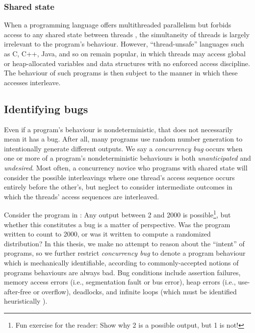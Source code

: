 \subsubsection{Shared state}
When a programming language offers multithreaded parallelism but forbids access to any shared state between threads \cite{rust-book},
the simultaneity of threads is largely irrelevant to the program's behaviour.
However, ``thread-unsafe'' languages such as C, C++, Java, and so on remain popular,
in which threads may access global or heap-allocated variables and data structures with no enforced access discipline.
The behaviour of such programs is then subject to the manner in which these accesses interleave.

\subsection{Identifying bugs}

Even if a program's behaviour is nondeterministic, that does not necessarily mean it has a bug.
After all, many programs use random number generation to intentionally generate different outputs.
We say a {\em concurrency bug} occurs when one or more of a program's nondeterministic behaviours is both {\em unanticipated} and {\em undesired}.
Most often, a concurrency novice who programs with shared state will consider the possible interleavings where one thread's access sequence occurs entirely before the other's, but neglect to consider intermediate outcomes in which the threads' access sequences are interleaved.

Consider the program in : Any output between 2 and 2000 is possible\footnote{
	Fun exercise for the reader: Show why 2 is a possible output, but 1 is not!
},
but whether this constitutes a bug is a matter of perspective.
Was the program written to count to 2000, or was it written to compute a randomized distribution?
In this thesis, we make no attempt to reason about the ``intent'' of programs,
so we further restrict {\em concurrency bug} to denote a program behaviour which is mechanically identifiable,
according to commonly-accepted notions of  programs behaviours are always bad.
%
Bug conditions include assertion failures,
memory access errors (i.e., segmentation fault or bus error),
heap errors (i.e., use-after-free or overflow),
deadlocks,
and infinite loops (which must be identified heuristically \cite{entscheidungsproblem}).

